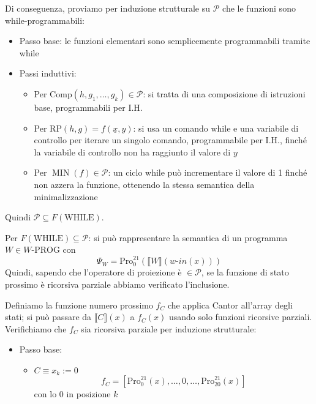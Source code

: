 \documentclass[12pt, answers]{exam}
\theoremstyle{plain}
\DeclareMathOperator{\MIN}{MIN}
\newcommand{\while}{\text{WHILE}}
\newcommand{\wprog}{W\text{-PROG}}
\newcommand{\comp}{\text{Comp}}
\newcommand{\rp}{\text{RP}}
\newcommand{\cp}{\mathcal{P}}
\newcommand{\pro}{\text{Pro}}
\newcommand{\win}{w\text{-}in}
\begin{document}
\begin{questions}
\begin{solution}
             Di conseguenza, proviamo per induzione strutturale su $\cp$ che le funzioni sono while-programmabili: 
            \begin{itemize}
                \item Passo base: le funzioni elementari sono semplicemente programmabili tramite while
                
                \item Passi induttivi: 
                \begin{itemize}
                    \item Per $\comp (h,g_1, \dots, g_k) \in \cp$: si tratta di una composizione di istruzioni base, programmabili per I.H.
                    
                    \item Per $\rp (h, g) = f(\underline{x}, y)$: si usa un comando while e una variabile di controllo per iterare un singolo comando, programmabile per I.H., finché la variabile di controllo non ha raggiunto il valore di $y$
                    
                    \item Per $\MIN(f) \in \cp$: un ciclo while può incrementare il valore di 1 finché non azzera la funzione, ottenendo la stessa semantica della minimalizzazione
                \end{itemize}
            \end{itemize}
            Quindi $\cp \subseteq F(\while)$.
            
            Per $F(\while) \subseteq \cp$: si può rappresentare la semantica di un programma $W \in \wprog$ con 
            $$ \Psi_W = \pro^{21}_0 (\llbracket W \rrbracket (\win (x))) $$
            Quindi, sapendo che l'operatore di proiezione è $\in \cp$, se la funzione di stato prossimo è ricorsiva parziale abbiamo verificato l'inclusione. 
            
            Definiamo la funzione numero prossimo $f_C$ che applica Cantor all'array degli stati; si può passare da $\llbracket C \rrbracket (x)$ a $f_C (x)$ usando solo funzioni ricorsive parziali. Verifichiamo che $f_C$ sia ricorsiva parziale per induzione strutturale: 
            \begin{itemize}
                \item Passo base:
                
                \begin{itemize}
                    \item $C \equiv x_k :=0$
                    $$ f_C = \left[ \pro^{21}_0 (x), \dots, 0, \dots, \pro^{21}_20 (x) \right] $$
                    con lo 0 in posizione $k$
                    

\end{itemize}
\end{itemize}
\end{solution}
\end{questions}
\end{document}
